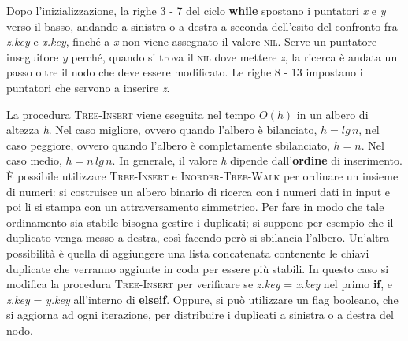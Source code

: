 \documentclass[10pt, a4paper]{report}
\begin{document}
Dopo l'inizializzazione, la righe 3 - 7 del ciclo \textbf{while} spostano i puntatori \textit{x} e \textit{y} verso il basso, andando a sinistra o a destra a seconda dell'esito del confronto fra \textit{z.key} e \textit{x.key}, finché a \textit{x} non viene assegnato il valore \textsc{nil}. Serve un puntatore inseguitore \textit{y} perché, quando si trova il \textsc{nil} dove mettere \textit{z}, la ricerca è andata un passo oltre il nodo che deve essere modificato. Le righe 8 - 13 impostano i puntatori che servono a inserire \textit{z}.

La procedura \textsc{Tree-Insert} viene eseguita nel tempo $O(h)$ in un albero di altezza \textit{h}. Nel caso migliore, ovvero quando l'albero è bilanciato, $h = lg\,n$, nel caso peggiore, ovvero quando l'albero è completamente sbilanciato, $h = n$. Nel caso medio, $h = n\,lg\,n$. In generale, il valore \textit{h} dipende dall'\textbf{ordine} di inserimento.\\

È possibile utilizzare \textsc{Tree-Insert} e \textsc{Inorder-Tree-Walk} per ordinare un insieme di numeri: si costruisce un albero binario di ricerca con i numeri dati in input e poi li si stampa con un attraversamento simmetrico. Per fare in modo che tale ordinamento sia stabile bisogna gestire i duplicati; si suppone per esempio che il duplicato venga messo a destra, così facendo però si sbilancia l'albero. Un'altra possibilità è quella di aggiungere una lista concatenata contenente le chiavi duplicate che verranno aggiunte in coda per essere più stabili. In questo caso si modifica la procedura \textsc{Tree-Insert} per verificare se \textit{z.key} = \textit{x.key} nel primo \textbf{if}, e \textit{z.key} = \textit{y.key} all'interno di \textbf{elseif}. Oppure, si può utilizzare un flag booleano, che si aggiorna ad ogni iterazione, per distribuire i duplicati a sinistra o a destra del nodo.
\end{document}
